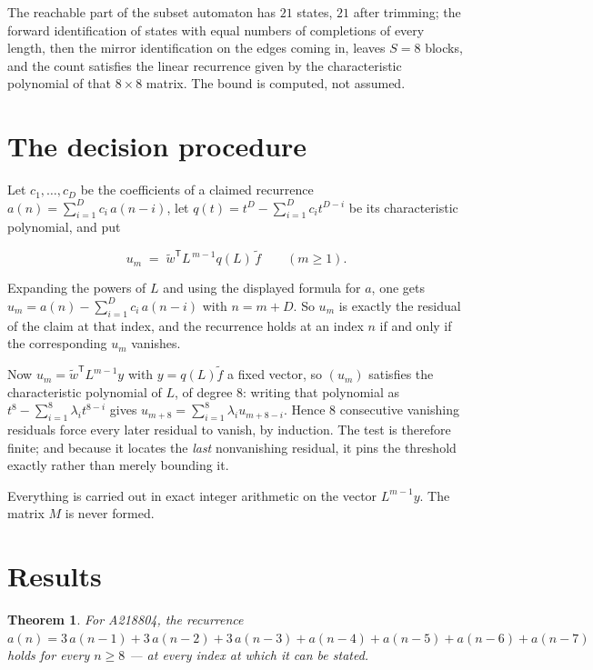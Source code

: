 \documentclass[11pt]{article}
\newtheorem{theorem}{Theorem}
\theoremstyle{definition}
\begin{document}
The reachable part of the subset automaton has $21$ states, $21$ after trimming; the forward identification of states with equal numbers of completions of every length, then the mirror identification on the edges coming in, leaves $S = 8$ blocks, and the count satisfies the linear recurrence given by the characteristic polynomial of that $8\times8$ matrix. The bound is computed, not assumed.

\section{The decision procedure}

Let $c_1,\dots,c_D$ be the coefficients of a claimed recurrence $a(n) = \sum_{i=1}^{D} c_i\,a(n-i)$, let $q(t) = t^{D} - \sum_{i=1}^{D} c_i t^{D-i}$ be its characteristic polynomial, and put

\[u_m \;=\; \tilde w^{\mathsf T} L^{\,m-1} q(L)\,\tilde f \qquad (m \ge 1).\]

Expanding the powers of $L$ and using the displayed formula for $a$, one gets $u_m = a(n) - \sum_{i=1}^{D} c_i\,a(n-i)$ with $n = m + D$. So $u_m$ is exactly the residual of the claim at that index, and the recurrence holds at an index $n$ if and only if the corresponding $u_m$ vanishes.

Now $u_m = \tilde w^{\mathsf T} L^{m-1} y$ with $y = q(L)\tilde f$ a fixed vector, so $(u_m)$ satisfies the characteristic polynomial of $L$, of degree $8$: writing that polynomial as $t^{8} - \sum_{i=1}^{8} \lambda_i t^{8-i}$ gives $u_{m+8} = \sum_{i=1}^{8} \lambda_i u_{m+8-i}$. Hence $8$ consecutive vanishing residuals force every later residual to vanish, by induction. The test is therefore finite; and because it locates the {\itshape last} nonvanishing residual, it pins the threshold exactly rather than merely bounding it.

Everything is carried out in exact integer arithmetic on the vector $L^{m-1}y$. The matrix $M$ is never formed.

\section{Results}

\begin{theorem} For A218804, the recurrence $a(n) = 3\,a(n-1) + 3\,a(n-2) + 3\,a(n-3) + a(n-4) + a(n-5) + a(n-6) + a(n-7)$ holds for every $n \ge 8$ --- at every index at which it can be stated.\end{theorem}
\end{document}
